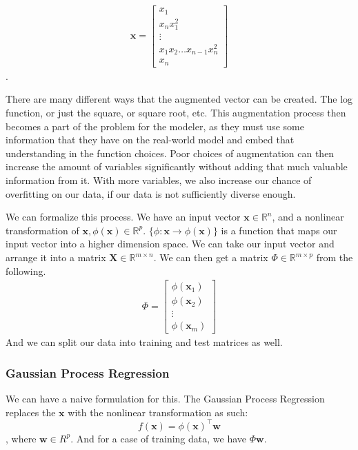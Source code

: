 \documentclass[11pt]{article}
\begin{document}
\begin{align}
  \textbf{x} = 
  \begin{bmatrix}
    x_1 \\ x_n x_1^2 \\ \vdots \\ x_1 x_2 \dots x_{n-1} x_n^2 \\ x_n
  \end{bmatrix}
\end{align}.

There are many different ways that the augmented vector can be created.
The log function, or just the square, or square root, etc.
This augmentation process then becomes a part of the problem for the modeler, as they must use some information that they have on the real-world model and embed that understanding in the function choices.
Poor choices of augmentation can then increase the amount of variables significantly without adding that much valuable information from it.
With more variables, we also increase our chance of overfitting on our data, if our data is not sufficiently diverse enough.

We can formalize this process.
We have an input vector $\textbf{x} \in \mathbb{R}^n$, and a nonlinear transformation of $\textbf{x}, \phi(\textbf{x}) \in \mathbb{R}^{p}$.
$\{ \phi : \textbf{x}\to \phi(\textbf{x})  \}$ is a function that maps our input vector into a higher dimension space.
We can take our input vector and arrange it into a matrix $\textbf{X} \in \mathbb{R}^{m \times n}$.
We can then get a matrix $\Phi \in \mathbb{R}^{m \times p} $ from the following.
\begin{align}
  \Phi = 
  \begin{bmatrix}
    \phi (\textbf{x}_1) \\ \phi (\textbf{x}_2) \\ \vdots \\ \phi (\textbf{x}_m)
  \end{bmatrix}
\end{align}
And we can split our data into training and test matrices as well.

\subsubsection{Gaussian Process Regression}
We can have a naive formulation for this.
The Gaussian Process Regression replaces the $\textbf{x}$ with the nonlinear transformation as such:
\begin{equation}
  f(\textbf{x}) = \phi(\textbf{x})^\top \textbf{w}
\end{equation},
where $\textbf{w} \in R^p$.
And for a case of training data, we have $\Phi \textbf{w}$.
\end{document}
